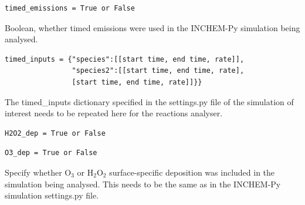 \documentclass[a4paper]{refart}
\begin{document}
\begin{verbatim}
timed_emissions = True or False
\end{verbatim}
Boolean, whether timed emissions were used in the INCHEM-Py simulation being analysed.

\begin{verbatim}
timed_inputs = {"species":[[start time, end time, rate]],
                "species2":[[start time, end time, rate],
                [start time, end time, rate]]}}
\end{verbatim}
The timed\_inputs dictionary specified in the settings.py file of the simulation of interest needs to be repeated here for the reactions analyser.

\begin{verbatim}
H2O2_dep = True or False
\end{verbatim}
\begin{verbatim}
O3_dep = True or False
\end{verbatim}
Specify whether O$_3$ or H$_2$O$_2$ surface-specific deposition was included in the simulation being analysed. This needs to be the same as in the INCHEM-Py simulation settings.py file.
\end{document}
